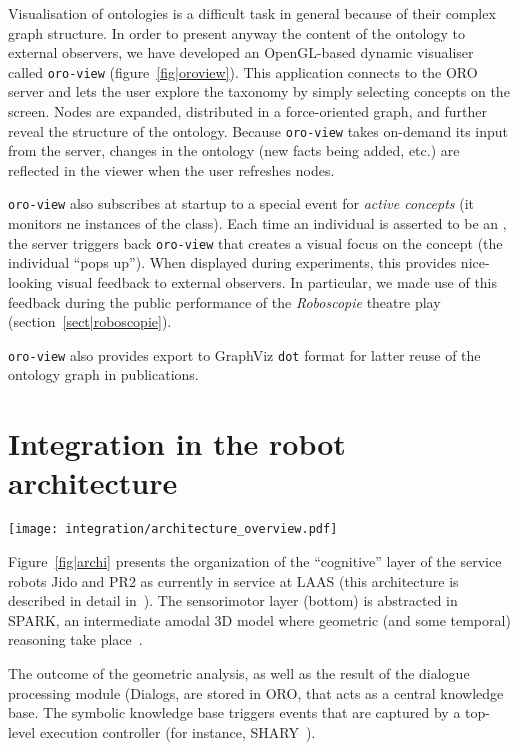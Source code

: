 Visualisation of ontologies is a difficult task in general because of their
complex graph structure. In order to present anyway the content of the ontology
to external observers, we have developed an OpenGL-based dynamic visualiser
called {\tt oro-view} (figure~\ref{fig|oroview}). This application connects to
the ORO server and lets the user explore the taxonomy by simply selecting
concepts on the screen. Nodes are expanded, distributed in a force-oriented
graph, and further reveal the structure of the ontology. Because {\tt oro-view}
takes on-demand its input from the server, changes in the ontology (new facts
being added, etc.) are reflected in the viewer when the user refreshes nodes.

{\tt oro-view} also subscribes at startup to a special event for \emph{active
concepts} (\ie it monitors ne instances of the  class).
Each time an individual is asserted to be an , the
server triggers back {\tt oro-view} that creates a visual focus on the concept
(the individual ``pops up''). When displayed during experiments, this provides
nice-looking visual feedback to external observers. In particular, we made use
of this feedback during the public performance of the \emph{Roboscopie} theatre
play (section~\ref{sect|roboscopie}).

{\tt oro-view} also provides export to GraphViz {\tt dot} format for latter
reuse of the ontology graph in publications.

\section{Integration in the robot architecture}

\begin{figure*}[thpb]
  \centering
  \texttt{[image: integration/architecture\_overview.pdf]}
  \caption {Software architecture for a service robot interacting with humans.}
  \label{fig|archi}
\end{figure*}

Figure~\ref{fig|archi} presents the organization of the ``cognitive'' layer of
the service robots Jido and PR2 as currently in service at LAAS (this
architecture is described in detail in~\cite{Alami2011}). The sensorimotor
layer (bottom) is abstracted in SPARK, an intermediate amodal 3D model where
geometric (and some temporal) reasoning take place~\cite{Sisbot2011}.

The outcome of the geometric analysis, as well as the result of the dialogue
processing module ({\sc Dialogs}, are stored in ORO, that acts as a central
knowledge base. The symbolic knowledge base triggers events that are captured
by a top-level execution controller (for instance, SHARY~\cite{Warnier2012}).

